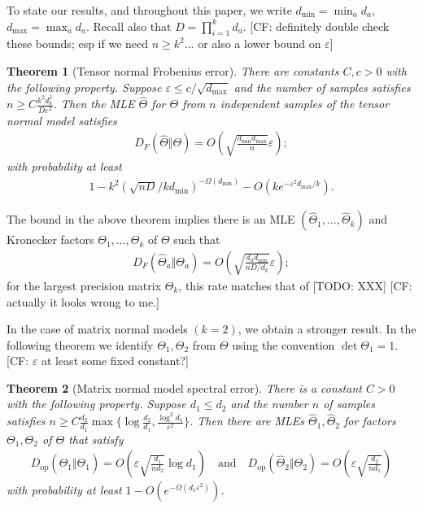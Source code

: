 \documentclass[aos]{imsart}
\newtheorem{theorem}{Theorem}[section]
\theoremstyle{definition}
\numberwithin{equation}{section}
\DeclareMathOperator{\op}{op}
\newcommand{\htheta}{\widehat{\Theta}}
\newcommand{\eps}{\varepsilon}
\newcommand{\CF}[1]{{\color{purple}[CF: #1]}}
\newcommand{\TODO}[1]{{\color{blue}[TODO: #1]}}
\begin{document}
To state our results, and throughout this paper, we write $d_{\min} = \min_a d_a$, $d_{\max} = \max_a d_a$.
Recall also that $D = \prod_{i=1}^k d_a$.
\CF{definitely double check these bounds; esp if we need $n \geq k^2...$ or also a lower bound on $\eps$}

\begin{theorem}[Tensor normal Frobenius error]\label{thm:tensor-frobenius}
There are constants $C,c>0$ with the following property.
Suppose $\eps \leq c/\sqrt{d_{\max}}$ and the number of samples satisfies $n \geq C \frac{k^2 d_k^3}{D\eps^2}$.
Then the MLE $\htheta $ for $\Theta$ from $n$ independent samples of the tensor normal model satisfies
\begin{align*}
  D_F(\widehat{\Theta} \Vert \Theta) = O\left( \sqrt{\frac{d_{\min}d_{\max}}{n }}\eps\right);
\end{align*}
with probability at least
\begin{align*}
  1 - k^2 \left(\sqrt{nD} / kd_{\min} \right)^{ - \Omega(d_{\min})} - O(k e^{ - \eps^2 d_{\max} / k}).
\end{align*}
\end{theorem}

The bound in the above theorem implies there is an MLE $(\htheta_1, \dots, \htheta_k)$ and Kronecker factors $\Theta_1, \dots, \Theta_k$ of $\Theta$ such that
\begin{align*}
  D_F(\widehat{\Theta}_a \Vert \Theta_a) = O\left( \sqrt{\frac{d_a d_{\min}}{n D/d_k}}\eps\right);
\end{align*}
\noindent
for the largest precision matrix $\Theta_k$, this rate matches that of \TODO{XXX} \CF{actually it looks wrong to me.}

In the case of matrix normal models $(k=2)$, we obtain a stronger result. In the following theorem we identify $\Theta_1, \Theta_2$ from $\Theta$ using the convention $\det \Theta_1 = 1$.
\CF{$\eps$ at least some fixed constant?}
\begin{theorem}[Matrix normal model spectral error]\label{thm:matrix-normal}
There is a constant $C>0$ with the following property.
Suppose $d_1 \leq d_2$ and the number $n$ of samples satisfies $n \geq C \frac{d_2}{d_1} \max \{\log \frac{d_2}{d_1},  \frac{\log^2 d_1}{\eps^2}\}$.
Then there are MLEs $\widehat{\Theta}_1,\widehat{\Theta}_2$ for factors $\Theta_1, \Theta_2$ of $\Theta$ that satisfy
\begin{align*}
  D_{\op}(\widehat{\Theta}_1 \Vert \Theta_1) = O\left(\eps \sqrt{\frac{d_1}{nd_2}} \log d_1\right)
\quad\text{and}\quad
D_{\op}(\widehat{\Theta}_2 \Vert \Theta_2) = O\left(\eps \sqrt{\frac{d_2}{nd_1}}\right)
\end{align*}
with probability at least $1 - O(e^{ - \Omega( d_1 \eps^2)})$.
\end{theorem}
\end{document}
